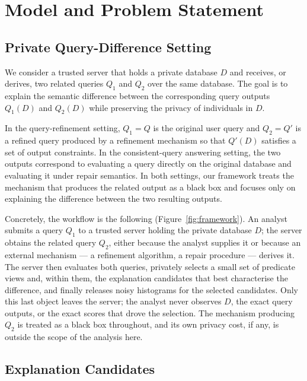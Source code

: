 
\section{Model and Problem Statement}\label{sec:model}

\subsection{Private Query-Difference Setting}
\label{subsec:private-query-difference-setting}

We consider a trusted server that holds a private database $D$ and receives, or derives, two related queries $Q_1$ and $Q_2$ over the same database.
The goal is to explain the semantic difference between the corresponding query outputs $Q_1(D)$ and $Q_2(D)$ while preserving the privacy of individuals in $D$.

In the query-refinement setting, $Q_1=Q$ is the original user query and $Q_2=Q'$ is a refined query produced by a refinement mechanism so that $Q'(D)$ satisfies a set of output constraints.
In the consistent-query answering setting, the two outputs correspond to evaluating a query directly on the original database and evaluating it under repair semantics.
In both settings, our framework treats the mechanism that produces the related output as a black box and focuses only on explaining the difference between the two resulting outputs.

Concretely, the workflow is the following (Figure~\ref{fig:framework}).
An analyst submits a query $Q_1$ to a trusted server holding the private database $D$; the server obtains the related query $Q_2$, either because the analyst supplies it or because an external mechanism --- a refinement algorithm, a repair procedure --- derives it.
The server then evaluates both queries, privately selects a small set of predicate views and, within them, the explanation candidates that best characterise the difference, and finally releases noisy histograms for the selected candidates.
Only this last object leaves the server; the analyst never observes $D$, the exact query outputs, or the exact scores that drove the selection.
The mechanism producing $Q_2$ is treated as a black box throughout, and its own privacy cost, if any, is outside the scope of the analysis here.

\subsection{Explanation Candidates}
\label{subsec:explanation-candidates}

